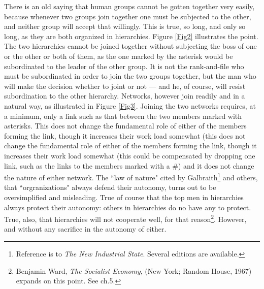 \documentclass[12pt, onecolumn, letterpaper, oneside]{book}
\begin{document}
There is an old saying that human groups cannot be gotten together very easily, because whenever two groups join together one must be subjected to the other, and neither group will accept that willingly. This is true, so long, and only so long, as they are both organized in hierarchies. Figure \ref{Fig2} illustrates the point. The two hierarchies cannot be joined together without subjecting the boss of one or the other or both of them, as the one marked by the asterisk would be subordinated to the leader of the other group. It is not the rank-and-file who must be subordinated in order to join the two groups together, but the man who will make the decision whether to joint or not --- and he, of course, will resist subordination to the other hierarchy. Networks, however join readily and in a natural way, as illustrated in Figure \ref{Fig3}. Joining the two networks requires, at a minimum, only a link such as that between the two members marked with asterisks. This does not change the fundamental role of either of the members forming the link, though it increases their work load somewhat (this does not change the fundamental role of either of the members forming the link, though it increases their work load somewhat (this could be compensated by dropping one link, such as the links to the members marked with a \#) and it does not change the nature of either network. The ``law of nature" cited by Galbraith\footnote{Reference is to \emph{The New Industrial State}. Several editions are available.} and others, that ``orgranizations" always defend their autonomy, turns out to be oversimplified and misleading. True of course that the top men in hierarchies always protect their autonomy: others in hierarchies do no have any to protect. True, also, that hierarchies will not cooperate well, for that reason\footnote{Benjamin Ward, \emph{The Socialist Economy}, (New York; Random House, 1967) expands on this point. See ch.5.}. However, and without any sacrifice in the autonomy of either.\\
\end{document}
